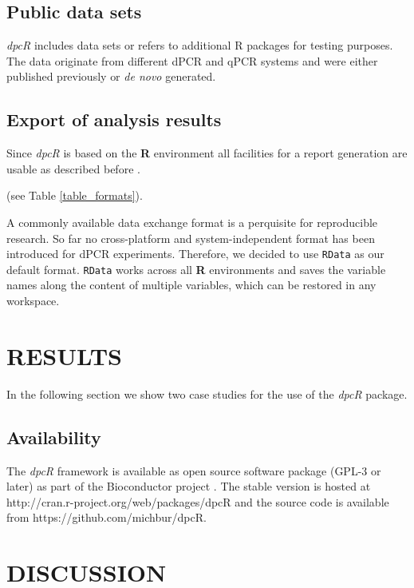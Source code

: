 \documentclass[a4,center,fleqn]{NAR}
\begin{document}
\subsection{Public data sets}

\textit{dpcR} includes data sets or refers to additional R packages for testing 
purposes. The data originate from different dPCR and qPCR systems and were 
either published previously \cite{whale_comparison_2012, 
roediger2015chippcr, white_digital_2009, rodiger_r_2015} or \textit{de novo} generated.

\subsection{Export of analysis results}

Since \textit{dpcR} is based on the \textbf{R} environment all facilities for a 
report generation are usable as described before \cite{rodiger_r_2015}.

(see Table \ref{table_formats}).

A commonly available data exchange format is a perquisite for reproducible 
research. So far no cross-platform and system-independent format has been 
introduced for dPCR experiments. Therefore, we decided to use \texttt{RData} as 
our default format. \texttt{RData} works across all \textbf{R} environments and 
saves the variable names along the content of multiple variables, which can be 
restored in any workspace.


\section{RESULTS}

In the following section we show two case studies for the use of the \textit{dpcR} package.

\subsection{Availability}

The \textit{dpcR} framework is available as open source software package (GPL-3 
or later) as part of the Bioconductor project \cite{gentleman_2004}. The stable 
version is hosted at http://cran.r-project.org/web/packages/dpcR and the source 
code is available from  https://github.com/michbur/dpcR.

\section{DISCUSSION}
\end{document}
